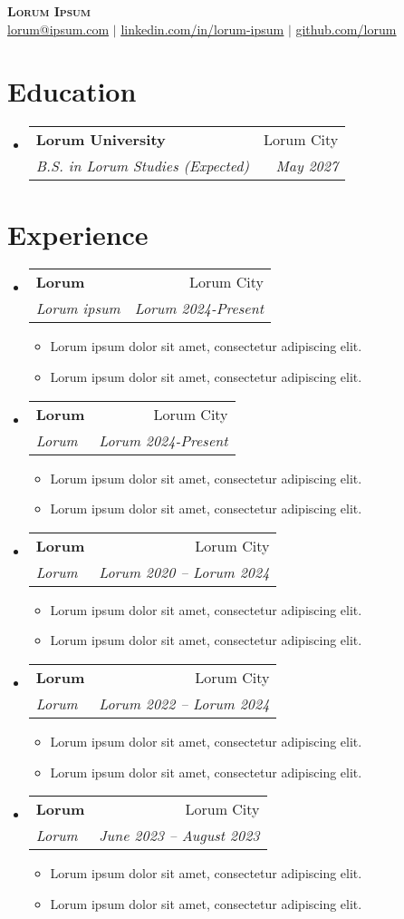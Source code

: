 \documentclass[letterpaper,10pt]{article}
\makeatletter
\newcommand{\resumeItem}[1]{\item\small{{#1 \vspace{-2pt}}}}
\newcommand{\resumeSubheading}[4]{\vspace{-2pt}\item \begin{tabular*}{\textwidth}[t]{l@{\extracolsep{\fill}}r} \textbf{#1} & #2 \\ \textit{\small#3} & \textit{\small #4} \end{tabular*}\vspace{-5pt}}
\newcommand{\resumeSubHeadingListStart}{\begin{itemize}[leftmargin=0.15in, label={}]}
\newcommand{\resumeSubHeadingListEnd}{\end{itemize}}
\newcommand{\resumeItemListStart}{\begin{itemize}[leftmargin=0.5in]}  %
\newcommand{\resumeItemListEnd}{\end{itemize}\vspace{-5pt}}
\makeatother
\begin{document}
\begin{center}
    \textbf{\Huge \scshape Lorum Ipsum} \\ \vspace{1pt}
    \small \href{mailto:lorum@ipsum.com}{lorum@ipsum.com} $|$ 
    \href{https://www.linkedin.com/in/lorum-ipsum/}{\underline{linkedin.com/in/lorum-ipsum}} $|$ 
    \href{https://github.com/lorum}{\underline{github.com/lorum}}
\end{center}

\section{Education}
  \resumeSubHeadingListStart
    \resumeSubheading
      {Lorum University}{Lorum City}
      {B.S. in Lorum Studies (Expected)}{May 2027}
  \resumeSubHeadingListEnd

\section{Experience}
  \resumeSubHeadingListStart

    \resumeSubheading
      {Lorum }{Lorum City}
      {Lorum ipsum}{Lorum 2024-Present}
      \resumeItemListStart
             \resumeItem{Lorum ipsum dolor sit amet, consectetur adipiscing elit.}
            \resumeItem{Lorum ipsum dolor sit amet, consectetur adipiscing elit.}
      \resumeItemListEnd
     \resumeSubheading
      {Lorum }{Lorum City}
      {Lorum}{Lorum 2024-Present}
      \resumeItemListStart
        \resumeItem{Lorum ipsum dolor sit amet, consectetur adipiscing elit.}
        \resumeItem{Lorum ipsum dolor sit amet, consectetur adipiscing elit.}
      \resumeItemListEnd


    \resumeSubheading
      {Lorum }{Lorum City}
      {Lorum}{Lorum 2020 -- Lorum 2024}
      \resumeItemListStart
        \resumeItem{Lorum ipsum dolor sit amet, consectetur adipiscing elit.}
        \resumeItem{Lorum ipsum dolor sit amet, consectetur adipiscing elit.}
      \resumeItemListEnd

    \resumeSubheading
      {Lorum }{Lorum City}
      {Lorum}{Lorum 2022 -- Lorum 2024}
      \resumeItemListStart
        \resumeItem{Lorum ipsum dolor sit amet, consectetur adipiscing elit.}
        \resumeItem{Lorum ipsum dolor sit amet, consectetur adipiscing elit.}
      \resumeItemListEnd

    \resumeSubheading
      {Lorum}{Lorum City}
      {Lorum}{June 2023 -- August 2023}
      \resumeItemListStart
        \resumeItem{Lorum ipsum dolor sit amet, consectetur adipiscing elit.}
        \resumeItem{Lorum ipsum dolor sit amet, consectetur adipiscing elit.}
      \resumeItemListEnd
  \resumeSubHeadingListEnd
\end{document}
